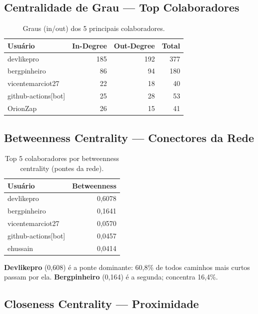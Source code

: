 \documentclass[12pt,a4paper]{article}
\begin{document}
\subsection{Centralidade de Grau — Top Colaboradores}

\begin{table}[h]
  \centering
  \caption{Graus (in/out) dos 5 principais colaboradores.}
  \label{tab:graus}
  \begin{tabular}{l|r|r|r}
    \toprule
    \textbf{Usuário} & \textbf{In-Degree} & \textbf{Out-Degree} & \textbf{Total} \\
    \midrule
    devlikepro           & 185 & 192 & 377 \\
    bergpinheiro         & 86  & 94  & 180 \\
    vicentemarciot27     & 22  & 18  & 40  \\
    github-actions[bot]  & 25  & 28  & 53  \\
    OrionZap             & 26  & 15  & 41  \\
    \bottomrule
  \end{tabular}
\end{table}

\subsection{Betweenness Centrality — Conectores da Rede}

\begin{table}[h]
  \centering
  \caption{Top 5 colaboradores por betweenness centrality (pontes da rede).}
  \label{tab:betweenness}
  \begin{tabular}{l|r}
    \toprule
    \textbf{Usuário} & \textbf{Betweenness} \\
    \midrule
    devlikepro         & 0,6078 \\
    bergpinheiro       & 0,1641 \\
    vicentemarciot27   & 0,0570 \\
    github-actions[bot] & 0,0457 \\
    ehussain           & 0,0414 \\
    \bottomrule
  \end{tabular}
\end{table}

\textbf{Devlikepro} (0,608) é a ponte dominante: 60,8\% de todos caminhos mais curtos passam por ela. \textbf{Bergpinheiro} (0,164) é a segunda; concentra 16,4\%.

\subsection{Closeness Centrality — Proximidade}
\end{document}
